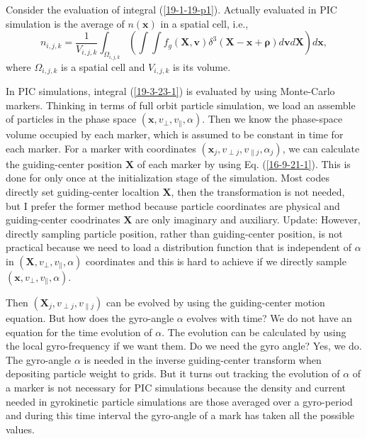 \documentclass{llncs}
\newcommand{\tmmathbf}[1]{\ensuremath{\boldsymbol{#1}}}
\begin{document}
Consider the evaluation of integral (\ref{19-1-19-p1}). Actually evaluated in
PIC simulation is the average of $n (\mathbf{x})$ in a spatial cell, i.e.,
\begin{equation}
  \label{19-3-23-1} n_{i, j, k} = \frac{1}{V_{i, j, k}} \int_{\Omega_{i, j,
  k}} \left( \int \int f_g (\mathbf{X}, \mathbf{v}) \delta^3
  (\mathbf{X}-\mathbf{x}+\tmmathbf{\rho}) d\mathbf{v}d\mathbf{X} \right)
  d\mathbf{x},
\end{equation}
where $\Omega_{i, j, k}$ is a spatial cell and $V_{i, j, k}$ is its volume.

In PIC simulations, integral (\ref{19-3-23-1}) is evaluated by using
Monte-Carlo markers. Thinking in terms of full orbit particle simulation, we
load an assemble of particles in the phase space $(\mathbf{x}, v_{\perp},
v_{\parallel}, \alpha)$. Then we know the phase-space volume occupied by each
marker, which is assumed to be constant in time for each marker. For a marker
with coordinates $(\mathbf{x}_j, v_{\perp j}, v_{\parallel j}, \alpha_j)$, we
can calculate the guiding-center position $\mathbf{X}$ of each marker by using
Eq. (\ref{16-9-21-1}). This is done for only once at the initialization stage
of the simulation. Most codes directly set guiding-center localtion
$\mathbf{X}$, then the transformation is not needed, but I prefer the former
method because particle coordinates are physical and guiding-center
coodrinates $\mathbf{X}$ are only imaginary and auxiliary. Update: However,
directly sampling particle position, rather than guiding-center position, is
not practical because we need to load a distribution function that is
independent of $\alpha$ in $(\mathbf{X}, v_{\perp}, v_{\parallel}, \alpha)$
coordinates and this is hard to achieve if we directly sample $(\mathbf{x},
v_{\perp}, v_{\parallel}, \alpha)$.

Then $(\mathbf{X}_j, v_{\perp j}, v_{\parallel j})$ can be evolved by using
the guiding-center motion equation. But how does the gyro-angle $\alpha$
evolves with time? We do not have an equation for the time evolution of
$\alpha$. The evolution can be calculated by using the local gyro-frequency if
we want them. Do we need the gyro angle? Yes, we do. The gyro-angle $\alpha$
is needed in the inverse guiding-center transform when depositing particle
weight to grids. But it turns out tracking the evolution of $\alpha$ of a
marker is not necessary for PIC simulations because the density and current
needed in gyrokinetic particle simulations are those averaged over a
gyro-period and during this time interval the gyro-angle of a mark has taken
all the possible values.
\end{document}
